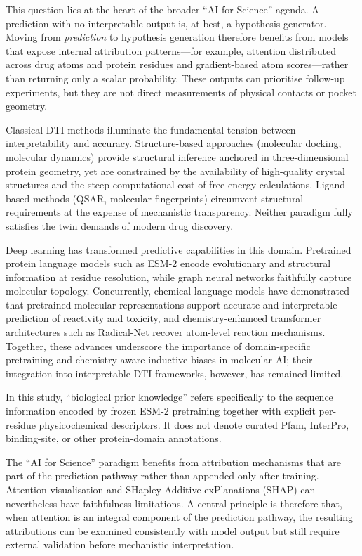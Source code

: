 \documentclass[fleqn,10pt]{wlscirep}
\begin{document}
This question lies at the heart of the broader ``AI for Science'' agenda.  A
prediction with no interpretable output is, at best, a hypothesis generator.
Moving from \emph{prediction} to hypothesis generation therefore benefits from
models that expose internal attribution patterns---for example, attention
distributed across drug atoms and protein residues and gradient-based atom
scores---rather than returning only a scalar probability.  These outputs can
prioritise follow-up experiments, but they are not direct measurements of
physical contacts or pocket geometry.

Classical DTI methods illuminate the fundamental tension between interpretability
and accuracy.  Structure-based approaches (molecular docking, molecular dynamics)
provide structural inference anchored in three-dimensional protein
geometry,\cite{kitchen2004docking} yet are constrained by the availability of
high-quality crystal structures and the steep computational cost of free-energy
calculations.  Ligand-based methods (QSAR, molecular
fingerprints)\cite{cherkasov2014qsar} circumvent structural requirements at
the expense of mechanistic transparency.  Neither paradigm fully satisfies the
twin demands of modern drug discovery.

Deep learning has transformed predictive capabilities in this domain.
Pretrained protein language models such as ESM-2\cite{lin2023evolutionary}
encode evolutionary and structural information at residue resolution, while
graph neural networks faithfully capture molecular topology.  Concurrently,
chemical language models have demonstrated that pretrained molecular
representations support accurate and interpretable prediction of reactivity and
toxicity,\cite{huang2025large} and chemistry-enhanced transformer
architectures such as Radical-Net recover atom-level reaction
mechanisms.\cite{huang2025radical}  Together, these advances underscore
the importance of domain-specific pretraining and chemistry-aware inductive
biases in molecular AI;\cite{huang2024ai} their integration into
interpretable DTI frameworks, however, has remained limited.

\begingroup\color{red}
In this study, ``biological prior knowledge'' refers specifically to the
sequence information encoded by frozen ESM-2 pretraining together with explicit
per-residue physicochemical descriptors. It does not denote curated Pfam,
InterPro, binding-site, or other protein-domain annotations.
\endgroup

The ``AI for Science'' paradigm benefits from attribution mechanisms that are
part of the prediction pathway rather than appended only after training.
Attention visualisation and SHapley Additive exPlanations (SHAP) can nevertheless
have faithfulness limitations.\cite{jain2019attention} \begingroup\color{red}A central principle is
therefore that, when attention is an integral component of the prediction
pathway, the resulting attributions can be examined consistently with model
output but still require external validation before mechanistic interpretation.\endgroup
\end{document}
